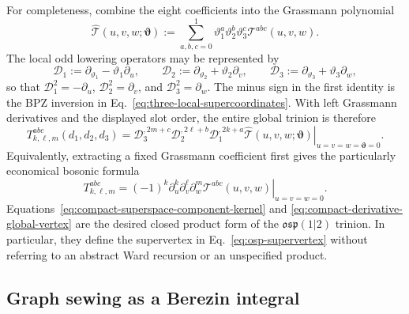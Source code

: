 \documentclass[11pt]{article}
\newcommand{\osp}{\mathfrak{osp}(1|2)}
\begin{document}
For completeness, combine the eight coefficients into the Grassmann
polynomial
\begin{equation}
 \widehat{\mathscr T}(u,v,w;\bm\vartheta)
 :=\sum_{a,b,c=0}^{1}
 \vartheta_1^a\vartheta_2^b\vartheta_3^c
 \mathscr T^{abc}(u,v,w).
 \label{eq:local-supervertex-generating-function}
\end{equation}
The local odd lowering operators may be represented by
\begin{equation}
 \mathscr D_1:=\partial_{\vartheta_1}
                  -\vartheta_1\partial_u,
 \qquad
 \mathscr D_2:=\partial_{\vartheta_2}
                  +\vartheta_2\partial_v,
 \qquad
 \mathscr D_3:=\partial_{\vartheta_3}
                  +\vartheta_3\partial_w,
 \label{eq:local-odd-descendant-operators}
\end{equation}
so that
\(\mathscr D_1^2=-\partial_u\),
\(\mathscr D_2^2=\partial_v\), and
\(\mathscr D_3^2=\partial_w\).  The minus sign in the first identity is
the BPZ inversion in Eq.~\eqref{eq:three-local-supercoordinates}.  With
left Grassmann derivatives and the displayed slot order, the entire global
trinion is therefore
\begin{equation}
\boxed{
 T_{k,\ell,m}^{abc}(d_1,d_2,d_3)
 =\left.
 \mathscr D_3^{,2m+c}
 \mathscr D_2^{,2\ell+b}
 \mathscr D_1^{,2k+a}
 \widehat{\mathscr T}(u,v,w;\bm\vartheta)
 \right|_{u=v=w=\bm\vartheta=0}.}
 \label{eq:superderivative-global-vertex}
\end{equation}
Equivalently, extracting a fixed Grassmann coefficient first gives the
particularly economical bosonic formula
\begin{equation}
\boxed{
 T_{k,\ell,m}^{abc}
 =(-1)^k
 \left.
 \partial_u^k\partial_v^\ell\partial_w^m
 \mathscr T^{abc}(u,v,w)
 \right|_{u=v=w=0}.}
 \label{eq:compact-derivative-global-vertex}
\end{equation}
Equations~\eqref{eq:compact-superspace-component-kernel} and
\eqref{eq:compact-derivative-global-vertex} are the desired closed product
form of the \(\osp\) trinion.  In particular, they define the supervertex
in Eq.~\eqref{eq:osp-supervertex} without referring to an abstract Ward
recursion or an unspecified product.


\subsection{Graph sewing as a Berezin integral}
\label{sec:berezin-global-sewing}
\end{document}
